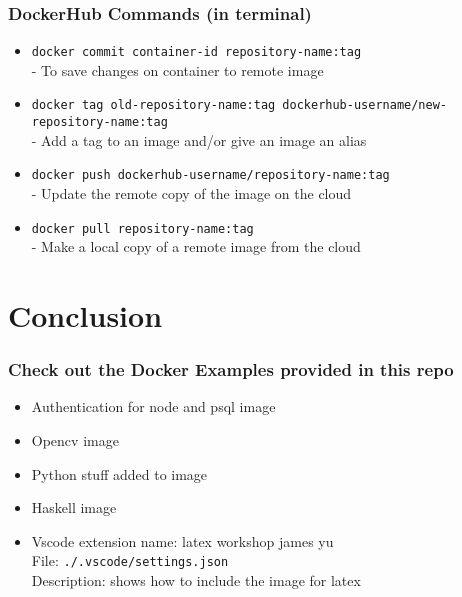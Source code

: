 \documentclass{beamer}
\begin{document}
\begin{frame}\frametitle{DockerHub Commands (in terminal)}
\begin{itemize}
\item \texttt{docker commit container-id repository-name:tag}\\- To save changes on container to remote image
\item \texttt{docker tag old-repository-name:tag dockerhub-username/new-repository-name:tag}\\- Add a tag to an image and/or give an image an alias
\item \texttt{docker push dockerhub-username/repository-name:tag}\\- Update the remote copy of the image on the cloud
\item \texttt{docker pull repository-name:tag}\\- Make a local copy of a remote image from the cloud
\end{itemize}
\end{frame}


\section{Conclusion}
\begin{frame}\frametitle{Check out the Docker Examples provided in this repo}
\begin{itemize}
\item Authentication for node and psql image
\item Opencv image
\item Python stuff added to image
\item Haskell image
\item Vscode extension name: latex workshop james yu\\ File: \texttt{./.vscode/settings.json}\\ Description: shows how to include the image for latex
\end{itemize}
\end{frame}
\end{document}
